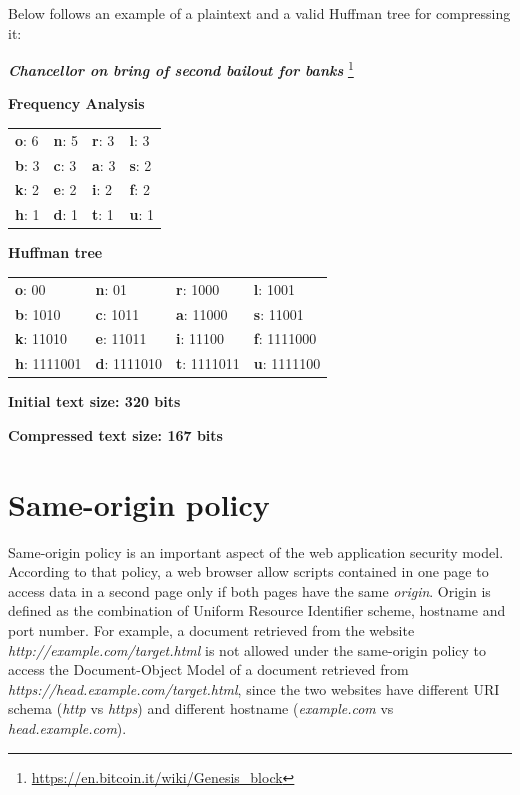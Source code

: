 Below follows an example of a plaintext and a valid Huffman tree for compressing it:

\bigskip
\centerline{\textit{\textbf{Chancellor on bring of second bailout for banks}} \footnote{\url{https://en.bitcoin.it/wiki/Genesis_block}}}

\bigskip
\centerline{\textbf{Frequency Analysis}}

\begin{table}[H]
    \centering
    \begin{tabular}{ | l | l | l | l | }
    \hline
    \textbf{o}: 6 & \textbf{n}: 5 & \textbf{r}: 3 & \textbf{l}: 3 \\
    \textbf{b}: 3 & \textbf{c}: 3 & \textbf{a}: 3 & \textbf{s}: 2 \\
    \textbf{k}: 2 & \textbf{e}: 2 & \textbf{i}: 2 & \textbf{f}: 2 \\
    \textbf{h}: 1 & \textbf{d}: 1 & \textbf{t}: 1 & \textbf{u}: 1 \\
    \hline
    \end{tabular}
\end{table}

\centerline{\textbf{Huffman tree}}

\begin{table}[H]
    \centering
    \begin{tabular}{ | l | l | l | l | }
    \hline
    \textbf{o}: 00 & \textbf{n}: 01 & \textbf{r}: 1000 & \textbf{l}: 1001 \\
    \textbf{b}: 1010 & \textbf{c}: 1011 & \textbf{a}: 11000 & \textbf{s}: 11001 \\
    \textbf{k}: 11010 & \textbf{e}: 11011 & \textbf{i}: 11100 & \textbf{f}: 1111000 \\
    \textbf{h}: 1111001 & \textbf{d}: 1111010 & \textbf{t}: 1111011 & \textbf{u}: 1111100 \\
    \hline
    \end{tabular}
\end{table}

\centerline{\textbf{Initial text size: 320 bits}}
\centerline{\textbf{Compressed text size: 167 bits}}

\section{Same-origin policy}\label{sec:sameorigin}

Same-origin policy is an important aspect of the web application security model. According to that policy, a web browser allow scripts contained in one page to access data in a second page only if both pages have the same \textit{origin}. Origin is defined as the combination of Uniform Resource Identifier scheme, hostname and port number. For example, a document retrieved from the website \textit{http://example.com/target.html} is not allowed under the same-origin policy to access the Document-Object Model of a document retrieved from \textit{https://head.example.com/target.html}, since the two websites have different URI schema (\textit{http} vs \textit{https}) and different hostname (\textit{example.com} vs \textit{head.example.com}).


